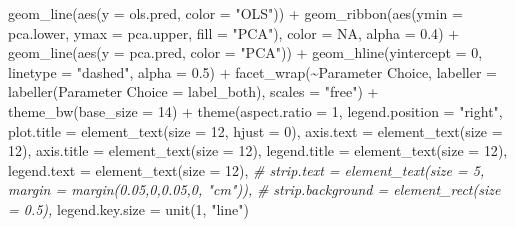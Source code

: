 \documentclass[print]{nuthesis}
\newenvironment{Shaded}{\begin{snugshade}}{\end{snugshade}}
\newcommand{\AttributeTok}[1]{\textcolor[rgb]{0.77,0.63,0.00}{#1}}
\newcommand{\CommentTok}[1]{\textcolor[rgb]{0.56,0.35,0.01}{\textit{#1}}}
\newcommand{\ConstantTok}[1]{\textcolor[rgb]{0.00,0.00,0.00}{#1}}
\newcommand{\DecValTok}[1]{\textcolor[rgb]{0.00,0.00,0.81}{#1}}
\newcommand{\FloatTok}[1]{\textcolor[rgb]{0.00,0.00,0.81}{#1}}
\newcommand{\FunctionTok}[1]{\textcolor[rgb]{0.00,0.00,0.00}{#1}}
\newcommand{\NormalTok}[1]{#1}
\newcommand{\OtherTok}[1]{\textcolor[rgb]{0.56,0.35,0.01}{#1}}
\newcommand{\SpecialCharTok}[1]{\textcolor[rgb]{0.00,0.00,0.00}{#1}}
\newcommand{\StringTok}[1]{\textcolor[rgb]{0.31,0.60,0.02}{#1}}
\begin{document}
\begin{Shaded}
\begin{Highlighting}[]
  \FunctionTok{geom\_line}\NormalTok{(}\FunctionTok{aes}\NormalTok{(}\AttributeTok{y =}\NormalTok{ ols.pred, }\AttributeTok{color =} \StringTok{"OLS"}\NormalTok{)) }\SpecialCharTok{+}
  \FunctionTok{geom\_ribbon}\NormalTok{(}\FunctionTok{aes}\NormalTok{(}\AttributeTok{ymin =}\NormalTok{ pca.lower, }\AttributeTok{ymax =}\NormalTok{ pca.upper, }\AttributeTok{fill =} \StringTok{"PCA"}\NormalTok{), }\AttributeTok{color =} \ConstantTok{NA}\NormalTok{, }\AttributeTok{alpha =} \FloatTok{0.4}\NormalTok{) }\SpecialCharTok{+}
  \FunctionTok{geom\_line}\NormalTok{(}\FunctionTok{aes}\NormalTok{(}\AttributeTok{y =}\NormalTok{ pca.pred, }\AttributeTok{color =} \StringTok{"PCA"}\NormalTok{)) }\SpecialCharTok{+}
  \FunctionTok{geom\_hline}\NormalTok{(}\AttributeTok{yintercept =} \DecValTok{0}\NormalTok{, }\AttributeTok{linetype =} \StringTok{"dashed"}\NormalTok{, }\AttributeTok{alpha =} \FloatTok{0.5}\NormalTok{) }\SpecialCharTok{+}
  \FunctionTok{facet\_wrap}\NormalTok{(}\SpecialCharTok{\textasciitilde{}}\StringTok{\textasciigrave{}}\AttributeTok{Parameter Choice}\StringTok{\textasciigrave{}}\NormalTok{, }\AttributeTok{labeller =} \FunctionTok{labeller}\NormalTok{(}\StringTok{\textasciigrave{}}\AttributeTok{Parameter Choice}\StringTok{\textasciigrave{}} \OtherTok{=}\NormalTok{ label\_both), }\AttributeTok{scales =} \StringTok{"free"}\NormalTok{) }\SpecialCharTok{+}
  \FunctionTok{theme\_bw}\NormalTok{(}\AttributeTok{base\_size =} \DecValTok{14}\NormalTok{) }\SpecialCharTok{+}
  \FunctionTok{theme}\NormalTok{(}\AttributeTok{aspect.ratio =} \DecValTok{1}\NormalTok{,}
        \AttributeTok{legend.position =} \StringTok{"right"}\NormalTok{,}
        \AttributeTok{plot.title   =} \FunctionTok{element\_text}\NormalTok{(}\AttributeTok{size =} \DecValTok{12}\NormalTok{, }\AttributeTok{hjust =} \DecValTok{0}\NormalTok{),}
        \AttributeTok{axis.text    =} \FunctionTok{element\_text}\NormalTok{(}\AttributeTok{size =} \DecValTok{12}\NormalTok{),}
        \AttributeTok{axis.title   =} \FunctionTok{element\_text}\NormalTok{(}\AttributeTok{size =} \DecValTok{12}\NormalTok{),}
        \AttributeTok{legend.title =} \FunctionTok{element\_text}\NormalTok{(}\AttributeTok{size =} \DecValTok{12}\NormalTok{),}
        \AttributeTok{legend.text  =} \FunctionTok{element\_text}\NormalTok{(}\AttributeTok{size =} \DecValTok{12}\NormalTok{),}
        \CommentTok{\# strip.text = element\_text(size = 5, margin = margin(0.05,0,0.05,0, "cm")),}
        \CommentTok{\# strip.background = element\_rect(size = 0.5),}
        \AttributeTok{legend.key.size =} \FunctionTok{unit}\NormalTok{(}\DecValTok{1}\NormalTok{, }\StringTok{"line"}\NormalTok{)}

\end{Highlighting}
\end{Shaded}
\end{document}
